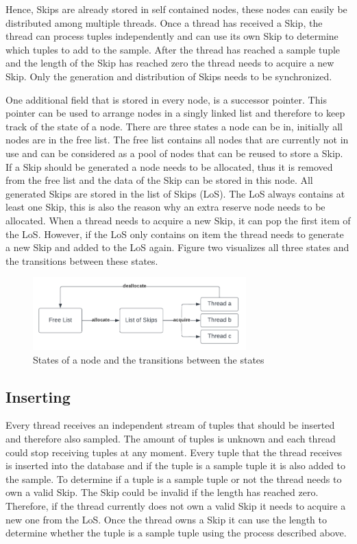 \documentclass[sigconf,nonacm]{acmart}
\begin{document}
        Hence, Skips are already stored in self contained nodes, these nodes can easily be distributed among multiple threads. Once a thread has received a Skip, the thread can process tuples independently and can use its own Skip to determine which tuples to add to the sample. After the thread has reached a sample tuple and the length of the Skip has reached zero the thread needs to acquire a new Skip. Only the generation and distribution of Skips needs to be synchronized.

        One additional field that is stored in every node, is a successor pointer. This pointer can be used to arrange nodes in a singly linked list and therefore to keep track of the state of a node. There are three states a node can be in, initially all nodes are in the free list. The free list contains all nodes that are currently not in use and can be considered as a pool of nodes that can be reused to store a Skip. If a Skip should be generated a node needs to be allocated, thus it is removed from the free list and the data of the Skip can be stored in this node. All generated Skips are stored in the list of Skips (LoS). The LoS always contains at least one Skip, this is also the reason why an extra reserve node needs to be allocated. When a thread needs to acquire a new Skip, it can pop the first item of the LoS. However, if the LoS only contains on item the thread needs to generate a new Skip and added to the LoS again. Figure two visualizes all three states and the transitions between these states.
        \begin{figure}[h]
            \includegraphics[height=2.8cm]{figure2.pdf}
            \caption{States of a node and the transitions between the states}
        \end{figure}

    \subsection{Inserting}
        Every thread receives an independent stream of tuples that should be inserted and therefore also sampled. The amount of tuples is unknown and each thread could stop receiving tuples at any moment. Every tuple  that the thread receives is inserted into the database and if the tuple is a sample tuple it is also added to the sample. To determine if a tuple is a sample tuple or not the thread needs to own a valid Skip. The Skip could be invalid if the length has reached zero. Therefore, if the thread currently does not own a valid Skip it needs to acquire a new one from the LoS. Once the thread owns a Skip it can use the length to determine whether the tuple is a sample tuple using the process described above.
\end{document}
